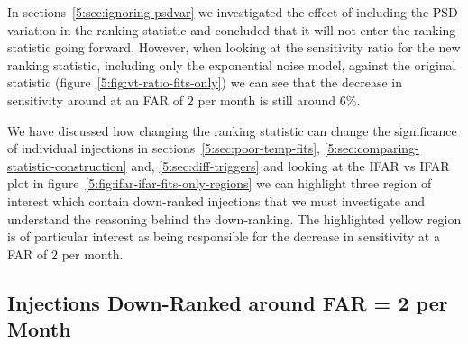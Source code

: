 In sections~\ref{5:sec:ignoring-psdvar} we investigated the effect of including the PSD variation in the ranking statistic and concluded that it will not enter the ranking statistic going forward. However, when looking at the sensitivity ratio for the new ranking statistic, including only the exponential noise model, against the original statistic (figure~\ref{5:fig:vt-ratio-fits-only}) we can see that the decrease in sensitivity around at an FAR of $2$ per month is still around $6\%$.

We have discussed how changing the ranking statistic can change the significance of individual injections in sections~\ref{5:sec:poor-temp-fits}, \ref{5:sec:comparing-statistic-construction} and, \ref{5:sec:diff-triggers} and looking at the IFAR vs IFAR plot in figure~\ref{5:fig:ifar-ifar-fits-only-regions} we can highlight three region of interest which contain down-ranked injections that we must investigate and understand the reasoning behind the down-ranking. The highlighted yellow region is of particular interest as being responsible for the decrease in sensitivity at a FAR of $2$ per month.

\subsection{\label{5:sec:bottom-left-region}Injections Down-Ranked around FAR = 2 per Month}

